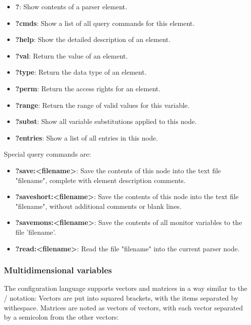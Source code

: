 \begin{itemize}
\item {\bf ?}: Show contents of a parser element.
\item {\bf ?cmds}: Show a list of all query commands for this element.
\item {\bf ?help}: Show the detailed description of an element.
\item {\bf ?val}: Return the value of an element.
\item {\bf ?type}: Return the data type of an element.
\item {\bf ?perm}: Return the access rights for an element.
\item {\bf ?range}: Return the range of valid values for this variable.
\item {\bf ?subst}: Show all variable substitutions applied to this node.
\item {\bf ?entries}: Show a list of all entries in this node.
\end{itemize}

Special query commands are:
%
%
%
%

\begin{itemize}
\item {\bf ?save:<filename>}: Save the contents of this node into the
text file "filename", complete with element description comments.
\item {\bf ?saveshort:<filename>}: Save the contents of this node into the
text file "filename", without additional comments or blank lines.
\item {\bf ?savemons:<filename>}: Save the contents of all monitor variables to
  the file 'filename'.
\item {\bf ?read:<filename>}: Read the file "filename" into the current
parser node.
\end{itemize}

\subsubsection{Multidimensional variables}%
%
%

The \mha{} configuration language supports vectors and matrices in a way similar
to the \Octave{} / \Matlab{} notation: Vectors are put into squared brackets, with
the items separated by withespace. Matrices are
noted as vectors of vectors, with each vector separated by a semicolon
from the other vectors:

